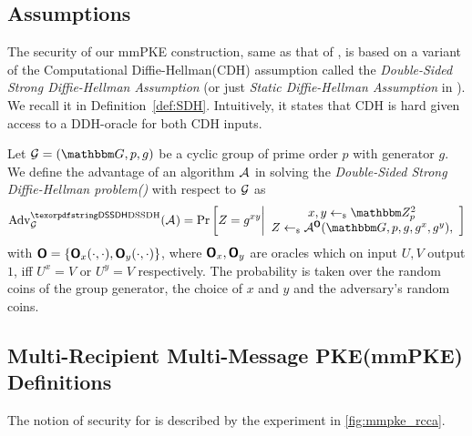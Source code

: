 
\subsection{Assumptions}
The security of our mmPKE construction, same as that of \cite{ASIACCS:PinPoeSch14}, is based on a variant of the Computational
Diffie-Hellman(CDH) assumption called the \emph{Double-Sided Strong Diffie-Hellman Assumption} (or just \emph{Static
  Diffie-Hellman Assumption} in \cite{ASIACCS:PinPoeSch14}). We recall it in Definition~\ref{def:SDH}. Intuitively, it states that
CDH is hard given access to a DDH-oracle for both CDH inputs.

\begin{definition}\label{def:SDH}
  Let $\Group = (\Grp, p, g)$ be a cyclic group of prime order $p$ with generator $g$. We define the advantage of an
  algorithm $\mathcal{A}_{\relax}$ in solving the \emph{Double-Sided Strong Diffie-Hellman problem(\sdh)} with respect to $\mathcal{G}$ as
  \[
    \adv{\sdh}{\Group}(\Adv) =
    \Pr\left[
      Z = g^{xy}
      \middle\vert
      \begin{array}{c}
        x, y \getsr \Z_p^2\\
        Z \getsr \Adv^{\oracle{O}}(\Grp,p,g,g^x,g^y),
      \end{array}
    \right]
  \]
with $\textnormal{\textsf{\bfseries O}} = \{\textnormal{\textsf{\bfseries O}}_x(\cdot,\cdot),\textnormal{\textsf{\bfseries O}}_y(\cdot,\cdot)\}$, where $\textnormal{\textsf{\bfseries O}}_x,\textnormal{\textsf{\bfseries O}}_y$ are oracles which on input $U,V$ output $1$, iff $U^x = V$ or $U^y = V$ respectively.
The probability is taken over the random coins of the group generator, the choice of $x$ and $y$ and the adversary's
random coins.
\end{definition}

\subsection{Multi-Recipient Multi-Message PKE(mmPKE) Definitions}\label{app:mmpke}
The notion of \mmindrcca security for \mmPKE is described by the experiment in \cref{fig:mmpke_rcca}.



